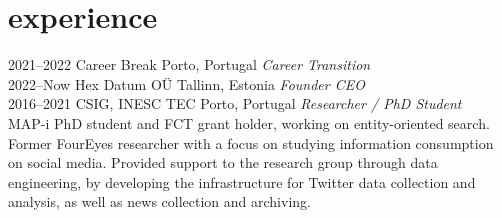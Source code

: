 \documentclass{friggeri-cv}
\begin{document}

\section{experience}

\begin{entrylist}
\entry
{2021--2022}
{Career Break}
{Porto, Portugal}
{\emph{Career Transition}\\

}
\entry
{2022--Now}
{Hex Datum OÜ}
{Tallinn, Estonia}
{\emph{Founder CEO}\\

}
\entry
{2016--2021}
{CSIG, INESC TEC}
{Porto, Portugal}
{\emph{Researcher / PhD Student}\\
MAP-i PhD student and FCT grant holder, working on entity-oriented search. Former FourEyes researcher with a focus on studying information consumption on social media. Provided support to the research group through data engineering, by developing the infrastructure for Twitter data collection and analysis, as well as news collection and archiving.}
\end{entrylist}
\end{document}
